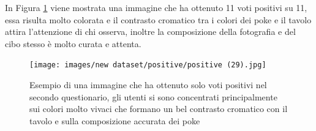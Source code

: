 In Figura \ref{esempioPos} viene mostrata una immagine che ha ottenuto 11 voti positivi su 11, essa risulta molto colorata e il contrasto cromatico tra i colori dei poke e il tavolo attira l'attenzione di chi osserva, inoltre la composizione della fotografia e del cibo stesso è molto curata e attenta.

\begin{figure}[H]
\centering
\texttt{[image: images/new dataset/positive/positive (29).jpg]}
\caption{Esempio di una immagine che ha ottenuto solo voti positivi nel secondo questionario, gli utenti si sono concentrati principalmente sui colori molto vivaci che formano un bel contrasto cromatico con il tavolo e sulla composizione accurata dei poke}
\label{esempioPos}
\end{figure}

